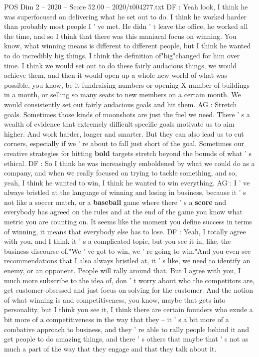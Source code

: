 \begin{textsample}{POS Dim 2 – 2020 – Score 52.00 – 2020/t004277.txt}
DF : Yeah look, I think he was superfocused on delivering what he set out to do.
I think he worked harder than probably most people I ' ve met.
He didn ' t leave the office, he worked all the time, and so I think that there was this maniacal focus on winning.
You know, what winning means is different to different people, but I think he wanted to do incredibly big things, I think the definition of"big"changed for him over time.
I think we would set out to do these fairly audacious things, we would achieve them, and then it would open up a whole new world of what was possible, you know, be it fundraising numbers or opening X number of buildings in a month, or selling so many seats to new members on a certain month.
We would consistently set out fairly audacious goals and hit them.
AG : Stretch goals.
Sometimes those kinds of moonshots are just the fuel we need.
There ' s a wealth of evidence that extremely difficult specific goals motivate us to aim higher.
And work harder, longer and smarter.
But they can also lead us to cut corners, especially if we ' re about to fall just short of the goal.
Sometimes our creative strategies for hitting \textbf{bold} targets stretch beyond the bounds of what ' s ethical.
DF : So I think he was increasingly emboldened by what we could do as a company, and when we really focused on trying to tackle something, and so, yeah, I think he wanted to win, I think he wanted to win everything.
AG : I ' ve always bristled at the language of winning and losing in business, because it ' s not like a soccer match, or a \textbf{baseball} game where there ' s a \textbf{score} and everybody has agreed on the rules and at the end of the game you know what metric you are counting on.
It seems like the moment you define success in terms of winning, it means that everybody else has to lose.
DF : Yeah, I totally agree with you, and I think it ' s a complicated topic, but you see it in, like, the business discourse of,"We ' ve got to win, we ' re going to win."And you even see recommendations that I also always bristled at, it ' s like, we need to identify an enemy, or an opponent.
People will rally around that.
But I agree with you, I much more subscribe to the idea of, don ' t worry about who the competitors are, get customer-obsessed and just focus on solving for the customer.
And the notion of what winning is and competitiveness, you know, maybe that gets into personality, but I think you see it, I think there are certain founders who exude a bit more of a competitiveness in the way that they -- it ' s a bit more of a combative approach to business, and they ' re able to rally people behind it and get people to do amazing things, and there ' s others that maybe that ' s not as much a part of the way that they engage and that they talk about it.

\end{textsample}
